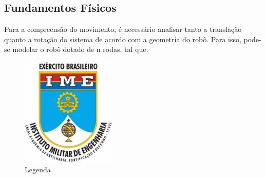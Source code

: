 \documentclass{article}
\begin{document}
\subsection{Fundamentos Físicos}

Para a compreensão do movimento, é necessário analisar tanto a translação quanto a rotação do sistema de acordo com a geometria do robô. Para isso, pode-se modelar o robô dotado de n rodas, tal que:

\begin{figure}[H]
\centering
\includegraphics[width=0.4\textwidth]{ime.jpg}
\caption{Legenda}
\label{Rotulo}
\end{figure}
\end{document}
